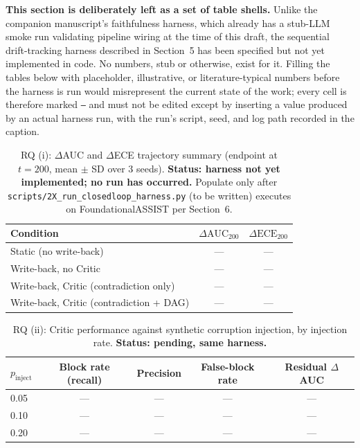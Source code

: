 \documentclass[review,12pt]{elsarticle}
\begin{document}
\textbf{This section is deliberately left as a set of table shells.}
Unlike the companion manuscript's faithfulness harness, which already has
a stub-LLM smoke run validating pipeline wiring at the time of this
draft, the sequential drift-tracking harness described in Section~5 has
been specified but not yet implemented in code. No numbers, stub or
otherwise, exist for it. Filling the tables below with placeholder,
illustrative, or literature-typical numbers before the harness is run
would misrepresent the current state of the work; every cell is therefore
marked \texttt{---} and must not be edited except by inserting a value
produced by an actual harness run, with the run's script, seed, and log
path recorded in the caption.

\begin{table}[!t]
\caption{RQ (i): $\Delta$AUC and $\Delta$ECE trajectory summary
(endpoint at $t{=}200$, mean $\pm$ SD over 3 seeds). \textbf{Status:
harness not yet implemented; no run has occurred.} Populate only after
\texttt{scripts/2X\_run\_closedloop\_harness.py} (to be written) executes
on FoundationalASSIST per Section~6.}
\label{tab:rq1-placeholder}
\centering
\small
\begin{tabular}{lcc}
\toprule
Condition & $\Delta\text{AUC}_{200}$ & $\Delta\text{ECE}_{200}$ \\
\midrule
Static (no write-back) & --- & --- \\
Write-back, no Critic & --- & --- \\
Write-back, Critic (contradiction only) & --- & --- \\
Write-back, Critic (contradiction + DAG) & --- & --- \\
\bottomrule
\end{tabular}
\end{table}

\begin{table}[!t]
\caption{RQ (ii): Critic performance against synthetic corruption
injection, by injection rate. \textbf{Status: pending, same harness.}}
\label{tab:rq2-placeholder}
\centering
\small
\begin{tabular}{lcccc}
\toprule
$p_{\text{inject}}$ & Block rate (recall) & Precision & False-block rate & Residual $\Delta$AUC \\
\midrule
0.05 & --- & --- & --- & --- \\
0.10 & --- & --- & --- & --- \\
0.20 & --- & --- & --- & --- \\
\bottomrule
\end{tabular}
\end{table}
\end{document}
